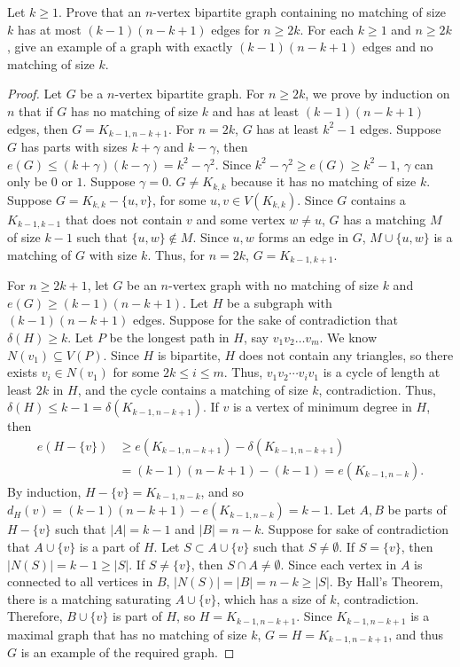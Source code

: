 \documentclass{article}
\newenvironment{problem}[2][Problem]{\begin{trivlist}
\item[\hskip \labelsep {\bfseries #1}\hskip \labelsep {\bfseries #2.}]}{\end{trivlist}}
\begin{document}
\begin{problem}{5.9.2}
     Let $k \geq 1$. Prove that an $n$-vertex bipartite graph containing no matching of size $k$ has at most $(k - 1)(n - k + 1)$ edges for $n \geq 2k$. For each $k \geq 1$ and $n \geq 2k$, give an example of a graph with exactly $(k - 1)(n - k + 1)$ edges and no matching of size $k$.
\end{problem}

\begin{proof}
    Let $G$ be a $n$-vertex bipartite graph. For $n \geq 2k$, we prove by induction on $n$ that if $G$ has no matching of size $k$ and has at least $(k-1)(n - k + 1)$ edges, then $G = K_{k-1,n-k+1}$. For $n = 2k$, $G$ has at least $k^2 - 1$ edges. Suppose $G$ has parts with sizes $k + \gamma$ and $k - \gamma$, then $e(G) \leq (k + \gamma)(k - \gamma) = k^2 - \gamma^2$. Since $k^2 - \gamma^2 \geq e(G) \geq k^2 - 1$, $\gamma$ can only be $0$ or $1$. Suppose $\gamma = 0$. $G \neq K_{k,k}$ because it has no matching of size $k$. Suppose $G = K_{k,k} - \{u, v\}$, for some $u,v \in V(K_{k,k})$. Since $G$ contains a $K_{k-1,k-1}$ that does not contain $v$ and some vertex $w \neq u$, $G$ has a matching $M$ of size $k - 1$ such that $\{u, w\} \notin M$. Since $u,w$ forms an edge in $G$, $M \cup \{u, w\}$ is a matching of $G$ with size $k$. Thus, for $n = 2k$, $G = K_{k-1,k+1}$. 
    
    For $n \geq 2k + 1$, let $G$ be an $n$-vertex graph with no matching of size $k$ and $e(G) \geq (k-1)(n - k + 1)$. Let $H$ be a subgraph with $(k-1)(n - k + 1)$ edges. Suppose for the sake of contradiction that $\delta(H) \geq k$. Let $P$ be the longest path in $H$, say $v_1v_2\dots v_m$. We know $N(v_1) \subseteq V(P)$. Since $H$ is bipartite, $H$ does not contain any triangles, so there exists $v_i \in N(v_1)$ for some $2k \leq i \leq m$. Thus, $v_1v_2\cdots v_iv_1$ is a cycle of length at least $2k$ in $H$, and the cycle contains a matching of size $k$, contradiction. Thus, $\delta(H) \leq k - 1 = \delta(K_{k-1,n-k+1})$. If $v$ is a vertex of minimum degree in $H$, then 
    \begin{align}
        e(H - \{v\}) 
        &\geq e(K_{k-1,n-k+1}) - \delta(K_{k-1,n-k+1}) \\
        &= (k-1)(n-k+1) - (k-1) = e(K_{k-1,n-k}).
    \end{align}
    By induction, $H - \{v\} = K_{k-1,n-k}$, and so $d_H(v) = (k-1)(n - k + 1) - e(K_{k-1,n-k}) = k - 1$. Let $A,B$ be parts of $H - \{v\}$ such that $|A| = k - 1$ and $|B| = n - k$. Suppose for sake of contradiction that $A \cup \{v\}$ is a part of $H$. Let $S \subset A \cup \{v\}$ such that $S \neq \emptyset$. If $S = \{v\}$, then $|N(S)| = k - 1 \geq |S|$. If $S \neq \{v\}$, then $S \cap A \neq \emptyset$. Since each vertex in $A$ is connected to all vertices in $B$, $|N(S)| = |B| = n - k \geq |S|$. By Hall's Theorem, there is a matching saturating $A \cup \{v\}$, which has a size of $k$, contradiction. Therefore, $B \cup \{v\}$ is part of $H$, so $H = K_{k-1,n-k+1}$. Since $K_{k-1,n-k+1}$ is a maximal graph that has no matching of size $k$, $G = H = K_{k-1,n-k+1}$, and thus $G$ is an example of the required graph.
\end{proof}
\end{document}
